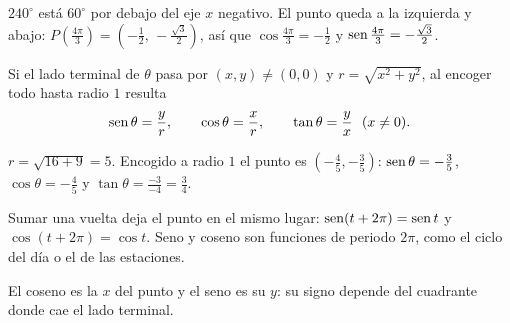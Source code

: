 \documentclass[11pt,a4paper]{article}
\let\nivelorig\nivel
\renewcommand{\nivel}[2]{\Needspace{8\baselineskip}\nivelorig{#1}{#2}}
\begin{document}
\begin{ejemplo}
$240^\circ$ está $60^\circ$ por debajo del eje $x$ negativo. El punto queda a la izquierda y abajo:
$P\!\left(\tfrac{4\pi}{3}\right)=\left(-\tfrac12,\,-\tfrac{\sqrt3}{2}\right)$, así que
$\cos\tfrac{4\pi}{3}=-\tfrac12$ y $\operatorname{sen}\tfrac{4\pi}{3}=-\tfrac{\sqrt3}{2}$.
\end{ejemplo}

\begin{propiedad}
Si el lado terminal de $\theta$ pasa por $(x,y)\neq(0,0)$ y $r=\sqrt{x^2+y^2}$, al encoger todo hasta radio $1$ resulta
\[ \sen\theta=\frac{y}{r},\qquad \cos\theta=\frac{x}{r},\qquad \tan\theta=\frac{y}{x}\ \ (x\neq0). \]
\end{propiedad}
\begin{ejemplo}[El punto $(-4,-3)$]
$r=\sqrt{16+9}=5$. Encogido a radio $1$ el punto es $\left(-\tfrac45,-\tfrac35\right)$: $\operatorname{sen}\theta=-\tfrac35$,
$\cos\theta=-\tfrac45$ y $\tan\theta=\tfrac{-3}{-4}=\tfrac34$.
\end{ejemplo}

\begin{propiedad}[Periodicidad]
Sumar una vuelta deja el punto en el mismo lugar: $\operatorname{sen}(t+2\pi)=\operatorname{sen} t$ y $\cos(t+2\pi)=\cos t$. Seno y coseno son
funciones  de periodo $2\pi$, como el ciclo del día o el de las estaciones.
\end{propiedad}


El coseno es la $x$ del punto y el seno es su $y$: su signo depende del cuadrante donde cae el lado terminal.
\end{document}
